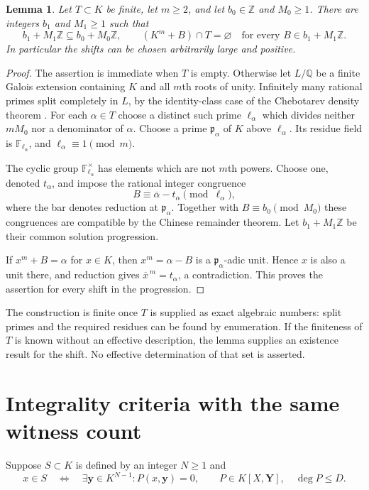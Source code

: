 \documentclass[11pt,a4paper]{article}
\newtheorem{lemma}[theorem]{Lemma}
\newcommand{\Q}{\mathbb Q}\newcommand{\Z}{\mathbb Z}
\begin{document}
\begin{lemma}\label{lem:avoid}
Let $T\subset K$ be finite, let $m\ge2$, and let $b_0\in\Z$ and
$M_0\ge1$. There are integers $b_1$ and $M_1\ge1$ such that
\[
 b_1+M_1\Z\subseteq b_0+M_0\Z,
 \qquad (K^m+B)\cap T=\varnothing
 \quad\text{for every }B\in b_1+M_1\Z.
\]
In particular the shifts can be chosen arbitrarily large and positive.
\end{lemma}
\begin{proof}
The assertion is immediate when $T$ is empty. Otherwise let $L/\Q$
be a finite Galois extension containing $K$ and all $m$th roots of
unity. Infinitely many rational primes split completely in $L$,
by the identity-class case of the Chebotarev density theorem
\cite[Theorem~8.31 and Corollary~8.32]{Milne}.
For each $\alpha\in T$ choose a distinct such prime $\ell_\alpha$
which divides neither $mM_0$ nor a denominator of $\alpha$.
Choose a prime $\mathfrak p_\alpha$ of $K$ above $\ell_\alpha$.
Its residue field is $\mathbb F_{\ell_\alpha}$, and
$\ell_\alpha\equiv1\pmod m$.

The cyclic group $\mathbb F_{\ell_\alpha}^{\times}$ has elements
which are not $m$th powers. Choose one, denoted $t_\alpha$, and
impose the rational integer congruence
\[
 B\equiv\overline\alpha-t_\alpha\pmod{\ell_\alpha},
\]
where the bar denotes reduction at $\mathfrak p_\alpha$.
Together with $B\equiv b_0\pmod{M_0}$ these congruences are
compatible by the Chinese remainder theorem. Let
$b_1+M_1\Z$ be their common solution progression.

If $x^m+B=\alpha$ for $x\in K$, then $x^m=\alpha-B$ is a
$\mathfrak p_\alpha$-adic unit. Hence $x$ is also a unit there,
and reduction gives $\overline x^{\,m}=t_\alpha$, a contradiction.
This proves the assertion for every shift in the progression.
\end{proof}

The construction is finite once $T$ is supplied as exact algebraic
numbers: split primes and the required residues can be found by
enumeration. If the finiteness of $T$ is known without an effective
description, the lemma supplies an existence result for the shift.
No effective determination of that set is asserted.

\section{Integrality criteria with the same witness count}
Suppose $S\subset K$ is defined by an integer $N\ge1$ and
\begin{equation}\label{eq:source}
 x\in S\quad\Longleftrightarrow\quad
 \exists\mathbf y\in K^{N-1}:P(x,\mathbf y)=0,
 \qquad P\in K[X,\mathbf Y],\quad\deg P\le D.
\end{equation}
\end{document}
